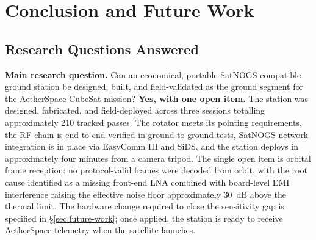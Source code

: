 \chapter{Conclusion and Future Work}
\label{ch:conclusion}

\section{Research Questions Answered}

\textbf{Main research question.} Can an economical, portable SatNOGS-compatible ground station be designed, built, and field-validated as the ground segment for the AetherSpace CubeSat mission? \textbf{Yes, with one open item.} The station was designed, fabricated, and field-deployed across three sessions totalling approximately 210 tracked passes. The rotator meets its pointing requirements, the RF chain is end-to-end verified in ground-to-ground tests, SatNOGS network integration is in place via EasyComm III and SiDS, and the station deploys in approximately four minutes from a camera tripod. The single open item is orbital frame reception: no protocol-valid frames were decoded from orbit, with the root cause identified as a missing front-end LNA combined with board-level EMI interference raising the effective noise floor approximately 30~dB above the thermal limit. The hardware change required to close the sensitivity gap is specified in \S\ref{sec:future-work}; once applied, the station is ready to receive AetherSpace telemetry when the satellite launches.

